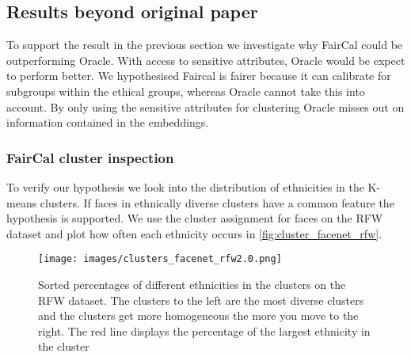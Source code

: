 \subsection{Results beyond original paper}


To support the result in the previous section we investigate why FairCal could be outperforming Oracle.
With access to sensitive attributes, Oracle would be expect to perform better.
We hypothesised Faircal is fairer because it can calibrate for subgroups within the ethical groups, whereas Oracle cannot take this into account.
By only using the sensitive attributes for clustering Oracle misses out on information contained in the embeddings. 


\subsubsection{FairCal cluster inspection}
To verify our hypothesis we look into the distribution of ethnicities in the K-means clusters.
If faces in ethnically diverse clusters have a common feature the hypothesis is supported.
We use the cluster assignment for faces on the RFW dataset and plot how often each ethnicity occurs in \autoref{fig:cluster_facenet_rfw}.

\begin{figure}
    \centering
    \texttt{[image: images/clusters\_facenet\_rfw2.0.png]}
    \caption{Sorted percentages of different ethnicities in the clusters on the RFW dataset. The clusters to the left are the most diverse clusters and the clusters get more homogeneous the more you move to the right. The red line displays the percentage of the largest ethnicity in the cluster}
    \label{fig:cluster_facenet_rfw}
\end{figure}

